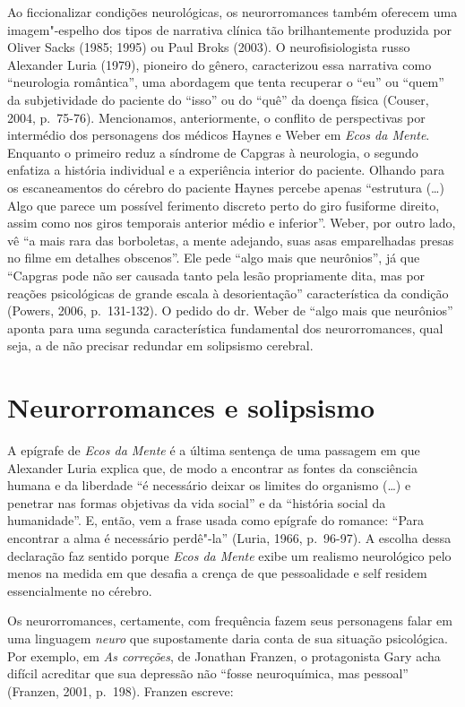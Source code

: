 Ao ficcionalizar condições neurológicas, os neurorromances também
oferecem uma imagem"-espelho dos tipos de narrativa clínica tão
brilhantemente produzida por Oliver Sacks (1985; 1995) ou Paul Broks
(2003). O neurofisiologista russo Alexander Luria (1979), pioneiro do
gênero, caracterizou essa narrativa como ``neurologia romântica'', uma
abordagem que tenta recuperar o ``eu'' ou ``quem'' da subjetividade do
paciente do ``isso'' ou do ``quê'' da doença física (Couser, 2004,
p.~75-76). Mencionamos, anteriormente, o conflito de perspectivas por
intermédio dos personagens dos médicos Haynes e Weber em \emph{Ecos da
Mente}. Enquanto o primeiro reduz a síndrome de Capgras à neurologia, o
segundo enfatiza a história individual e a experiência interior do
paciente. Olhando para os escaneamentos do cérebro do paciente Haynes
percebe apenas ``estrutura (\ldots{}) Algo que parece um possível ferimento
discreto perto do giro fusiforme direito, assim como nos giros temporais
anterior médio e inferior''. Weber, por outro lado, vê ``a mais rara das
borboletas, a mente adejando, suas asas emparelhadas presas no filme em
detalhes obscenos''. Ele pede ``algo mais que neurônios'', já que
``Capgras pode não ser causada tanto pela lesão propriamente dita, mas
por reações psicológicas de grande escala à desorientação''
característica da condição (Powers, 2006, p.~131-132). O pedido do dr.
Weber de ``algo mais que neurônios'' aponta para uma segunda
característica fundamental dos neurorromances, qual seja, a de não
precisar redundar em solipsismo cerebral.

\chapter{Neurorromances e solipsismo}

A epígrafe de \emph{Ecos da Mente} é a última sentença de uma passagem
em que Alexander Luria explica que, de modo a encontrar as fontes da
consciência humana e da liberdade ``é necessário deixar os limites do
organismo (\ldots{}) e penetrar nas formas objetivas da vida social'' e da
``história social da humanidade''. E, então, vem a frase usada como
epígrafe do romance: ``Para encontrar a alma é necessário perdê"-la''
(Luria, 1966, p.~96-97). A escolha dessa declaração faz sentido porque
\emph{Ecos da Mente} exibe um realismo neurológico pelo menos na medida
em que desafia a crença de que pessoalidade e self residem
essencialmente no cérebro.

Os neurorromances, certamente, com frequência fazem seus personagens
falar em uma linguagem \emph{neuro} que supostamente daria conta de sua
situação psicológica. Por exemplo, em \emph{As correções}, de Jonathan
Franzen, o protagonista Gary acha difícil acreditar que sua depressão
não ``fosse neuroquímica, mas pessoal'' (Franzen, 2001, p.~198). Franzen
escreve:

